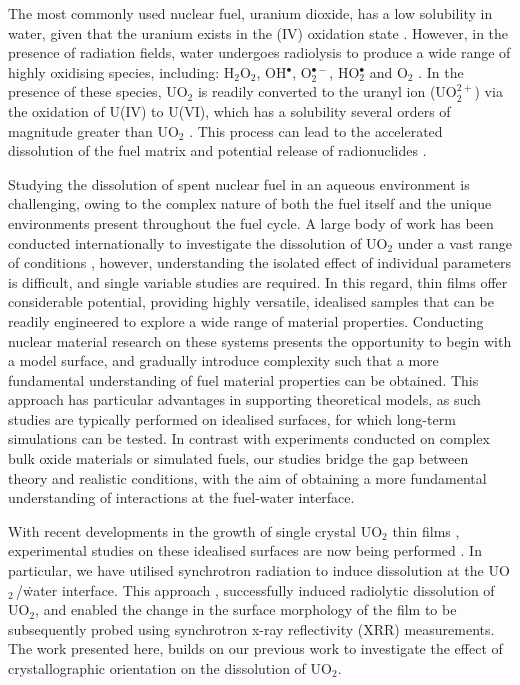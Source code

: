 \documentclass[twocolumn,prl,nobalancelastpage,aps,10pt]{revtex4-1}
\begin{document}
The most commonly used nuclear fuel, uranium dioxide, has a low solubility in water, given that the uranium exists in the (IV) oxidation state \cite{Shoesmith1992}. However, in the presence of radiation fields, water undergoes radiolysis to produce a wide range of highly oxidising species, including: H$_2$O$_2$, OH$^{\bullet}$, O$_2^{\bullet-}$, HO$_2^{\bullet}$ and O$_2$ \cite{LeCaer2011, Spinks1990, Shoesmith2007}. In the presence of these species, UO$_2$ is readily converted to the uranyl ion (UO$_{2}^{2+}$) via the oxidation of U(IV) to U(VI), which has a solubility several orders of magnitude greater than UO$_2$ \cite{Shoesmith1992,Bailey1985}. This process can lead to the accelerated dissolution of the fuel matrix and potential release of radionuclides \cite{Shoesmith2007}.

Studying the dissolution of spent nuclear fuel in an aqueous environment is challenging, owing to the complex nature of both the fuel itself and the unique environments present throughout the fuel cycle. A large body of work has been conducted internationally to investigate the dissolution of UO$_2$ under a vast range of conditions \cite{Sunder2004,Shoesmith1991,Shoesmith1989,Sunder1991,Bailey1985,Clarens2005,Shoesmith2007,Ekeroth2006,Eriksen2012}, however, understanding the isolated effect of individual parameters is difficult, and single variable studies are required.  In this regard, thin films offer considerable potential, providing highly versatile, idealised samples that can be readily engineered to explore a wide range of material properties. Conducting nuclear material research on these systems presents the opportunity to begin with a model surface, and gradually introduce complexity such that a more fundamental understanding of fuel material properties can be obtained. This approach has particular advantages in supporting theoretical models, as such studies are typically performed on idealised surfaces, for which long-term simulations can be tested. In contrast with experiments conducted on complex bulk oxide materials or simulated fuels, our studies bridge the gap between theory and realistic conditions, with the aim of obtaining a more fundamental understanding of interactions at the fuel-water interface.

With recent developments in the growth of single crystal UO$_2$ thin films \cite{Strehle2012,Bao2013}, experimental studies on these idealised surfaces are now being performed \cite{Springell2015,Teterin2016,Popel2017}. In particular, we have utilised synchrotron radiation to induce dissolution at the UO$_2$\,/\.water interface. This approach \cite{Springell2015}, successfully induced radiolytic dissolution of UO$_2$, and enabled the change in the surface morphology of the film to be subsequently probed using synchrotron x-ray reflectivity (XRR) measurements. The work presented here, builds on our previous work to investigate the effect of crystallographic orientation on the dissolution of UO$_2$.
\end{document}
